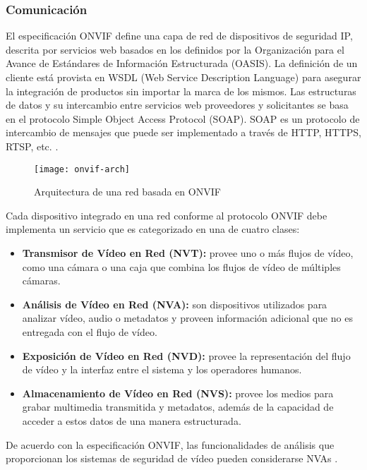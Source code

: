 \subsubsection{Comunicación}
El especificación ONVIF define una capa de red de dispositivos de seguridad IP, descrita por servicios web basados en los definidos por la Organización para el Avance de Estándares de Información Estructurada (OASIS). La definición de un cliente está provista en WSDL (Web Service Description Language) para asegurar la integración de productos sin importar la marca de los mismos. Las estructuras de datos y su intercambio entre servicios web proveedores y solicitantes se basa en el protocolo Simple Object Access Protocol (SOAP). SOAP es un protocolo de intercambio de mensajes que puede ser implementado a través de HTTP, HTTPS, RTSP, etc. \cite{Onvif2016-dc}.

    \begin{figure}[H]
        \centering
        \texttt{[image: onvif-arch]}
        \caption{Arquitectura de una red basada en ONVIF \protect\cite{Senst2011-bb}}
        \label{fig:onvif-arch}
    \end{figure}
    
Cada dispositivo integrado en una red conforme al protocolo ONVIF debe implementa un servicio que es categorizado en una de cuatro clases:

\begin{itemize}
\item \textbf{Transmisor de Vídeo en Red (NVT):} provee uno o más flujos de vídeo, como una cámara o una caja que combina los flujos de vídeo de múltiples cámaras.
\item \textbf{Análisis de Vídeo en Red (NVA):} son dispositivos utilizados para analizar vídeo, audio o metadatos y proveen información adicional que no es entregada con el flujo de vídeo. 
\item \textbf{Exposición de Vídeo en Red (NVD): }provee la representación del flujo de vídeo y la interfaz entre el sistema y los operadores humanos.
\item \textbf{Almacenamiento de Vídeo en Red (NVS):} provee los medios para grabar multimedia transmitida y metadatos, además de la capacidad de acceder a estos datos de una manera estructurada.
\end{itemize}

De acuerdo con la especificación ONVIF, las funcionalidades de análisis que proporcionan los sistemas de seguridad de vídeo pueden considerarse NVAs \cite{Senst2011-bb}.

